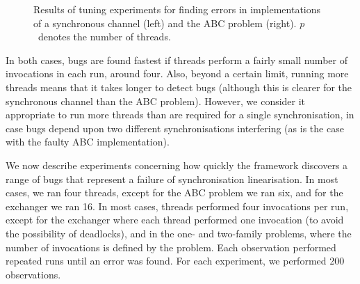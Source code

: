
\begin{figure}
\begin{minipage}{0.5\textwidth}

\end{minipage}
%
\begin{minipage}{0.5\textwidth}

\end{minipage}%
\caption{Results of tuning experiments for finding errors in implementations
  of a synchronous channel (left) and the ABC problem (right).  $p$~denotes
  the number of threads.  \label{fig:tuning}}
\end{figure}


In both cases, bugs are found fastest if threads perform a fairly small number
of invocations in each run, around four.  Also, beyond a certain limit,
running more threads means that it takes longer to detect bugs (although this
is clearer for the synchronous channel than the ABC problem).  However, we
consider it appropriate to run more threads than are required for a single
synchronisation, in case bugs depend upon two different synchronisations
interfering (as is the case with the faulty ABC implementation).




We now describe experiments concerning how quickly the framework discovers a
range of bugs that represent a failure of synchronisation linearisation.  In
most cases, we ran four threads, except for the ABC problem we ran six, and
for the exchanger we ran 16.  In most cases, threads performed four
invocations per run, except for the exchanger where each thread performed one
invocation (to avoid the possibility of deadlocks), and in the one- and
two-family problems, where the number of invocations is defined by the
problem.  Each observation performed repeated runs until an error was found.
For each experiment, we performed 200 observations.

